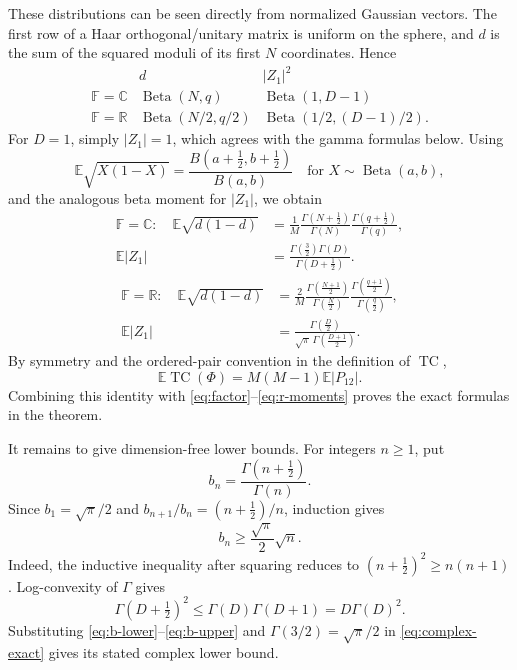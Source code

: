 \documentclass[10pt]{article}
\newcommand{\F}{\mathbb F}
\newcommand{\E}{\mathbb E}
\newcommand{\TC}{\operatorname{TC}}
\begin{document}
These distributions can be seen directly from normalized Gaussian vectors.
The first row of a Haar orthogonal/unitary matrix is uniform on the sphere, and
\(d\) is the sum of the squared moduli of its first \(N\) coordinates.  Hence
\[
\begin{array}{c|c|c}
 &d& |Z_1|^2\\ \hline
 \F=\mathbb C&\operatorname{Beta}(N,q)&
          \operatorname{Beta}(1,D-1)\\
 \F=\mathbb R&\operatorname{Beta}(N/2,q/2)&
          \operatorname{Beta}(1/2,(D-1)/2).
\end{array}
\]
For \(D=1\), simply \(|Z_1|=1\), which agrees with the gamma formulas below.
Using
\[
 \E\sqrt{X(1-X)}=\frac{B(a+\tfrac12,b+\tfrac12)}{B(a,b)}
 \quad\text{for }X\sim\operatorname{Beta}(a,b),
\]
and the analogous beta moment for \(|Z_1|\), we obtain
\begin{equation}\label{eq:c-moments}
\begin{aligned}
 \F=\mathbb C:\quad
 \E\sqrt{d(1-d)}
 &=\frac1M\frac{\Gamma(N+\tfrac12)}{\Gamma(N)}
             \frac{\Gamma(q+\tfrac12)}{\Gamma(q)},\\
 \E|Z_1|&=\frac{\Gamma(\tfrac32)\Gamma(D)}
                   {\Gamma(D+\tfrac12)}.
\end{aligned}
\end{equation}
\begin{equation}\label{eq:r-moments}
\begin{aligned}
 \F=\mathbb R:\quad
 \E\sqrt{d(1-d)}
 &=\frac2M\frac{\Gamma(\tfrac{N+1}{2})}{\Gamma(\tfrac N2)}
             \frac{\Gamma(\tfrac{q+1}{2})}{\Gamma(\tfrac q2)},\\
 \E|Z_1|&=\frac{\Gamma(\tfrac D2)}
                  {\sqrt\pi\,\Gamma(\tfrac{D+1}{2})}.
\end{aligned}
\end{equation}
By symmetry and the ordered-pair convention in the definition of \(\TC\),
\[
                  \E\TC(\Phi)=M(M-1)\E|P_{12}|.
\]
Combining this identity with \eqref{eq:factor}--\eqref{eq:r-moments} proves
the exact formulas in the theorem.

It remains to give dimension-free lower bounds.  For integers \(n\ge1\), put
\[
 b_n=\frac{\Gamma(n+\tfrac12)}{\Gamma(n)}.
\]
Since \(b_1=\sqrt\pi/2\) and
\(b_{n+1}/b_n=(n+\tfrac12)/n\), induction gives
\begin{equation}\label{eq:b-lower}
                   b_n\ge\frac{\sqrt\pi}{2}\sqrt n.
\end{equation}
Indeed, the inductive inequality after squaring reduces to
\((n+\tfrac12)^2\ge n(n+1)\).  Log-convexity of \(\Gamma\) gives
\begin{equation}\label{eq:b-upper}
 \Gamma(D+\tfrac12)^2\le\Gamma(D)\Gamma(D+1)
 =D\Gamma(D)^2.
\end{equation}
Substituting \eqref{eq:b-lower}--\eqref{eq:b-upper} and
\(\Gamma(3/2)=\sqrt\pi/2\) in \eqref{eq:complex-exact} gives its stated
complex lower bound.
\end{document}
